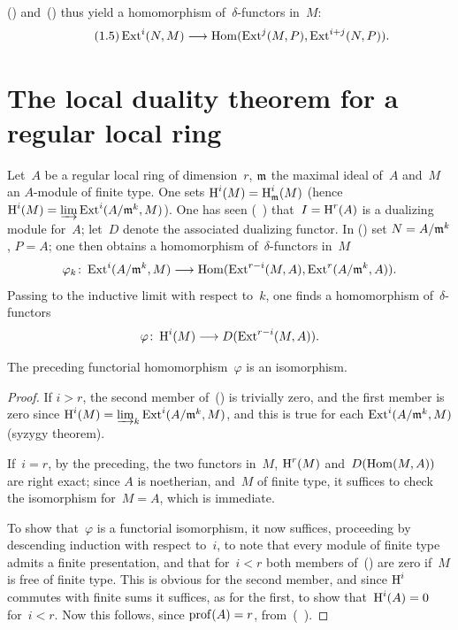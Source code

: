 () and~() thus yield a homomorphism of~$\delta$-functors in~$M$:
\begin{equation*} \label{eq:V.1.5} \tag{1.5} \Ext^{i}(N, M)\to\Hom(\Ext^{j}(M, P), \Ext^{i+j}(N, P)).
\end{equation*}

\section{The local duality theorem for a regular local ring} \label{V.2}

\setcounter{equation}{12}

Let~$A$ be a regular local ring of dimension~$r$, $\mathfrak{m}$ the maximal ideal of~$A$ and~$M$ an $A$-module of finite type. \label{pV2.4}One sets $\operatorname{H}^{i}(M)=\operatorname{H}^{i}_{\mathfrak{m}}(M)$ (hence $\operatorname{H}^{i}(M)=\varinjlim\operatorname{Ext}^{i}(A/\mathfrak{m}^{k}, M)$). One has seen (~) that~$I=\operatorname{H}^{r}(A)$ is a dualizing module for~$A$; let~$D$ denote the associated dualizing functor. In () set $N=A/\mathfrak{m}^{k}$, $P=A$; one then obtains a homomorphism of~$\delta$-functors in~$M$
\begin{equation} \label{eq:V.13} \varphi_{k}\colon\Ext^{i}(A/\mm^{k}, M)\to\Hom(\Ext^{r-i}(M, A), \Ext^{r}(A/\mm^{k}, A)).
\end{equation}
Passing to the inductive limit with respect to~$k$, one finds a homomorphism of~$\delta$-functors
\begin{equation} \label{eq:V.14} \varphi\colon\H^{i}(M)\to D(\Ext^{r-i}(M, A)).
\end{equation}

\begin{theorem} \label{V.2.1}
The preceding functorial homomorphism~$\varphi$ is an isomorphism.
\end{theorem}

\begin{proof}
If $i>r$, the second member of~() is trivially zero, and the first member is zero since $\operatorname{H}^{i}(M)=\varinjlim_{k}\operatorname{Ext}^{i}(A/\mathfrak{m}^{k}, M)$, and this is true for each $\operatorname{Ext}^{i}(A/\mathfrak{m}^{k}, M)$ (syzygy theorem).

If~$i=r$, by the preceding, the two functors in~$M$, $\operatorname{H}^{r}(M)$ and~$D(\operatorname{Hom}(M, A))$ are right exact; since $A$ is noetherian, and~$M$ of finite type, it suffices to check the isomorphism for~$M=A$, which is immediate.

To show that~$\varphi$ is a functorial isomorphism, it now suffices, proceeding by descending induction with respect to~$i$, to note that every module of finite type admits a finite presentation, and that for~$i<r$ both members of~() are zero if~$M$ is free of finite type. This is obvious for the second member, and since $\operatorname{H}^{i}$ commutes with finite sums it suffices, as for the first, to show that~$\operatorname{H}^{i}(A)=0$ for~$i<r$. Now this follows, since $\operatorname{prof}(A)=r$, from~(~).
\skipqed
\end{proof}
